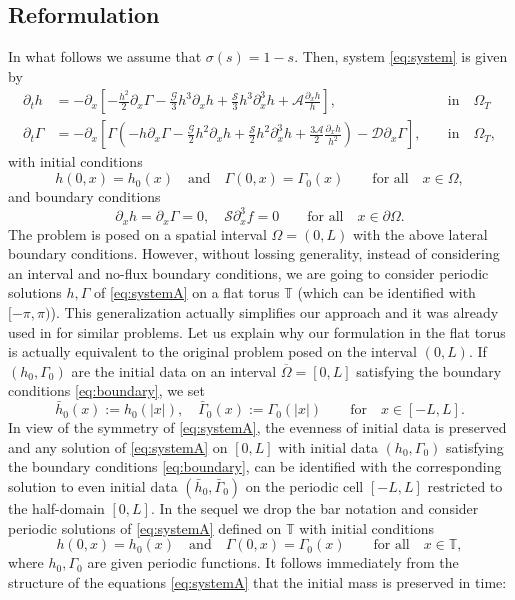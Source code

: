 \documentclass[reqno,11pt]{amsart}
\newcommand{\TT}{{\mathbb T}}
\begin{document}
\subsection{Reformulation}
In what follows we assume that $\sigma(s)=1-s$. Then, system \eqref{eq:system} is given by 
\begin{subequations}\label{eq:systemA}
	\begin{alignat}{2}
	\partial_t h &=-\partial_x \left[ -\frac{h^2}{2}\partial_x\Gamma-\frac{\mathcal{G}}{3}h^3\partial_x h + \frac{\mathcal{S}}{3}h^3\partial_x^3h+\mathcal{A}\frac{\partial_x h}{h} \right],\; &&\mbox{in}\quad \Omega_T \\
	\partial_t \Gamma &=- \partial_x \left[\Gamma \left(-h \partial_x \Gamma-\frac{\mathcal{G}}{2} h^2 \partial_x h +\frac{\mathcal{S}}{2} h^2 \partial_x^3 h + \frac{3\mathcal{A}}{2} \frac{\partial_x h }{h^{2}}\right)-\mathcal{D}\partial_x \Gamma \right],\;&&\mbox{in}\quad \Omega_T,
	\end{alignat}
\end{subequations}
with initial conditions
\[
h(0,x)=h_0(x)\quad \mbox{and}\quad \Gamma(0,x)=\Gamma_0(x)\qquad \mbox{for all} \quad x\in \Omega,
\]
and  boundary conditions
\begin{equation}\label{eq:boundary}
\partial_x h =\partial_x \Gamma=0, \quad \mathcal{S}\partial_x^3 f =0 \qquad \mbox{for all}\quad x\in \partial \Omega.
\end{equation}
 The problem is posed on a spatial interval $\Omega=(0,L)$ with the above lateral boundary conditions. However, without lossing generality, instead of considering an interval and no-flux boundary conditions, we are going to consider periodic solutions  $h,\Gamma$ of \eqref{eq:systemA} on a flat torus $\TT$ (which can be identified with $[-\pi,\pi)$). This generalization actually simplifies our approach and it was already used in \cite{BG18} for similar problems. Let us explain why our formulation in the flat torus is actually equivalent to the original problem posed on the interval $(0,L)$. If $(h_0,\Gamma_0)$ are the initial data on an interval $\overline \Omega=[0,L]$ satisfying the boundary conditions \eqref{eq:boundary}, we set
	\[
	\bar h_0(x):= h_0(|x|) ,\quad 	\bar \Gamma_0(x):=\Gamma_0(|x|)\qquad \mbox{for}\quad x\in [-L,L].
	\]
		In view of the symmetry of \eqref{eq:systemA}, the evenness of initial data is preserved and any solution of \eqref{eq:systemA} on $[0,L]$ with initial data $(h_0,\Gamma_0)$ satisfying the boundary conditions \eqref{eq:boundary}, can be identified with the corresponding solution to even initial data $(\bar h_0, \bar \Gamma_0)$ on the periodic cell $[-L,L]$ restricted to the half-domain $[0,L]$. In the sequel we drop the bar notation and consider periodic solutions of \eqref{eq:systemA} defined on $\TT$ with initial conditions 
\[
h(0,x)=h_0(x)\quad \mbox{and}\quad \Gamma(0,x)=\Gamma_0(x)\qquad \mbox{for all} \quad x\in \TT,
\]
where $h_0,\Gamma_0$ are given periodic functions.
It follows immediately from the structure of the equations \eqref{eq:systemA} that the initial mass is preserved in time:
\end{document}
